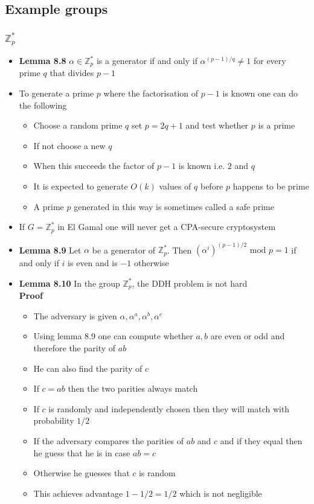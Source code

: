 \subsection{Example groups}
\subsubsection{$\mathbb Z_p^*$}
\begin{itemize}
  \item \textbf{Lemma 8.8} $\alpha \in \mathbb Z_p^*$ is a generator if and only if $\alpha^{(p-1)/q} \neq 1$ for every prime $q$ that divides $p-1$
  \item To generate a prime $p$ where the factorisation of $p-1$ is known one can do the following
  \begin{itemize}
  	\item Choose a random prime $q$ set $p=2q + 1$ and test whether $p$ is a prime
  	\item If not choose a new $q$
  	\item When this succeeds the factor of $p-1$ is known i.e. $2$ and $q$
  	\item It is expected to generate $O(k)$ values of $q$ before $p$ happens to be prime
  	\item A prime $p$ generated in this way is sometimes called a safe prime
  \end{itemize}

  \item If $G= \mathbb Z_p^*$ in El Gamal one will never get a CPA-secure cryptosystem

  \item \textbf{Lemma 8.9} Let $\alpha$ be a generator of $\mathbb Z^*_p$. Then $(\alpha^i)^{(p-1)/2} \text{ mod } p = 1$ if and only if $i$ is even and is $-1$ otherwise

  \item \textbf{Lemma 8.10} In the group $\mathbb Z_p^*$, the DDH problem is not hard \smallskip \\
  \textbf{Proof}
  \begin{itemize}
  	\item The adversary is given $\alpha, \alpha^a, \alpha^b, \alpha^c$ 
    \item Using lemma 8.9 one can compute whether $a,b$ are even or odd and therefore the parity of $ab$
    \item He can also find the parity of $c$
    \item If $c=ab$ then the two parities always match
    \item If $c$ is randomly and independently chosen then they will match with probability $1/2$
    \item If the adversary compares the parities of $ab$ and $c$ and if they equal then he guess that he is in case $ab = c$ 
    \item Otherwise he guesses that $c$ is random
    \item This achieves advantage $1-1/2 = 1/2$ which is not negligible
  \end{itemize}
\end{itemize}

